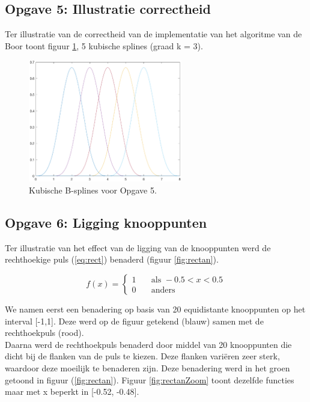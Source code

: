 \documentclass[a4paper]{article}
\newcommand{\opgave}[1]{\subsection{Opgave #1}}
\begin{document}



\opgave{5: Illustratie correctheid}\label{sec:oef5}
Ter illustratie van de correctheid van de implementatie van het algoritme van de Boor toont figuur \ref{fig:splines}, 5 kubische splines (graad k = 3).

\begin{figure}[H]
	\begin{center} 
		\includegraphics[width=0.6\textwidth]{BSplines.eps}
	\end{center}
	\caption{Kubische B-splines voor Opgave 5.}
	\label{fig:splines}
\end{figure}
\newpage

\opgave{6: Ligging knooppunten}\label{sec:oef6}
Ter illustratie van het effect van de ligging van de knooppunten werd de rechthoekige puls (\ref{eq:rect}) benaderd (figuur  \ref{fig:rectan}).

\begin{equation}
f(x) =
  \begin{cases}
    1       & \quad \text{als } -0.5 < x < 0.5\\
    0  & \quad \text{anders }
  \end{cases}
  \label{eq:rect}
\end{equation}

We namen eerst een benadering op basis van 20 equidistante knooppunten op het interval [-1,1]. Deze werd op de figuur getekend (blauw) samen met de rechthoekpuls (rood). \\

Daarna werd de rechthoekpuls benaderd door middel van 20 knooppunten die dicht bij de flanken van de puls te kiezen. Deze flanken vari\"eren zeer sterk, waardoor deze moeilijk te benaderen zijn. Deze benadering werd in het groen getoond in figuur (\ref{fig:rectan}). Figuur \ref{fig:rectanZoom} toont dezelfde functies maar met x beperkt in [-0.52, -0.48]. \\
\end{document}
